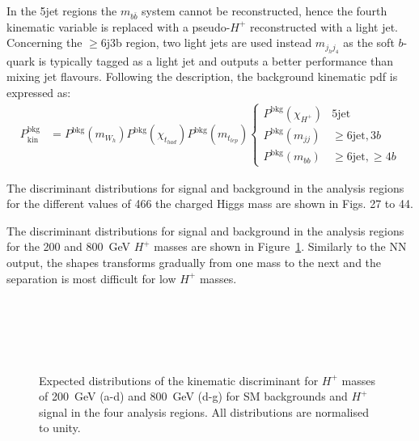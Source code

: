 In the 5jet regions the $m_{b\bar{b}}$ system cannot be reconstructed, hence the fourth kinematic variable is replaced with a pseudo-$H^+$ reconstructed with a light jet. Concerning the $\geq$6j3b region, two light jets are used instead $m_{j_hj_4}$ as the soft $b$-quark is typically tagged as a light jet and outputs a better performance than mixing jet flavours. Following the description, the background kinematic pdf is expressed as:
\begin{align}
    P_{\text{kin}}^{\text{bkg}}&=P^{\text{bkg}}(m_{W_h})P^{\text{bkg}}(\chi_{t_{had}})P^{\text{bkg}}(m_{t_{lep}})\begin{cases}P^{\text{bkg}}(\chi_{H^+}) & 5\text{jet} \\ P^{\text{bkg}}(m_{jj})&\geq6\text{jet},3b\\P^{\text{bkg}}(m_{bb})& \geq6\text{jet},\geq4b\end{cases}
\end{align}

The discriminant distributions for signal and background in the analysis regions for the different values of
466 the charged Higgs mass are shown in Figs. 27 to 44.

The discriminant distributions for signal and background in the analysis regions for the 200 and 800~GeV $H^+$ masses are shown in Figure~\ref{Hplustb:Discriminantshapes}. Similarly to the NN output, the shapes transforms gradually from one mass to the next and the separation is most difficult for low $H^+$ masses.

\begin{figure}[htb]
    \RawFloats
    \centering
     \\
     \\
     \\
     \\
    \caption{Expected distributions of the kinematic discriminant for $H^+$ masses of 200~GeV (a-d)
    and 800~GeV (d-g) for SM backgrounds and $H^+$ signal in the four analysis regions.
    All distributions are normalised to unity.
    }
    \label{Hplustb:Discriminantshapes}
\end{figure}
\clearpage